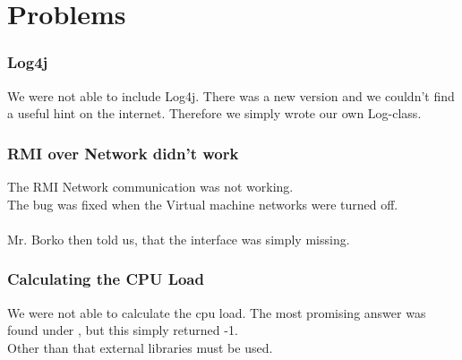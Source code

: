 \documentclass[12pt]{article}
\begin{document}
\section{Problems}
\subsubsection{Log4j}
We were not able to include Log4j. There was a new version and we couldn't find a useful hint on the internet.
Therefore we simply wrote our own Log-class.
\subsubsection{RMI over Network didn't work}
The RMI Network communication was not working. \\
The bug was fixed when the Virtual machine networks were turned off. \\ \\
Mr. Borko then told us, that the interface was simply missing.
\subsubsection{Calculating the CPU Load}
We were not able to calculate the cpu load. The most promising answer was found under \cite{cpuload}, but this simply returned -1. \\
Other than that external libraries must be used.
\end{document}
